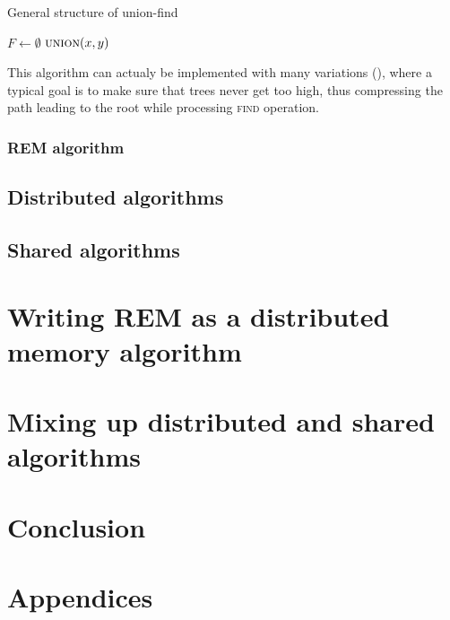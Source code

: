 \documentclass[12px]{article}
\begin{document}
      \begin{algorithm}[bh]
        \caption{General structure of union-find}
        \label{alg:union-find}
        \begin{algorithmic}[1]
          \State $F \leftarrow \emptyset$
            \State {}
          \EndFor
              \State $\Call{union}{x, y}$
            \EndIf
          \EndFor
        \end{algorithmic}
      \end{algorithm}

      This algorithm can actualy be implemented with many variations (), where a typical goal is to make sure that trees never get too high, thus compressing the path leading to the root while processing \textsc{find} operation.


      \subsubsection{REM algorithm}

    \subsection{Distributed algorithms}

    \subsection{Shared algorithms}


  \section{Writing REM as a distributed memory algorithm}


  \section{Mixing up distributed and shared algorithms}


  \section{Conclusion}


  \section{Appendices}


  
  
\end{document}
